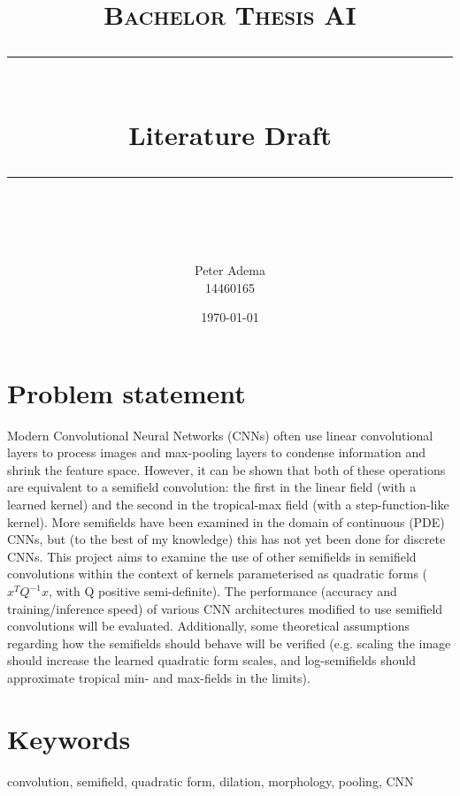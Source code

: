 \documentclass[11pt]{article} %
\title{	
    \vspace*{-1.5cm}
	\normalfont\normalsize
	\textsc{Bachelor Thesis AI}\\ %
	\vspace{3pt}
	\rule{\linewidth}{0.5pt}\\
	\vspace{14pt}
	{\huge Literature Draft}\\ %
	\vspace{4pt}
	\rule{\linewidth}{2pt}\\
	\vspace{4pt}
}
\author{
    \Large Peter Adema \\ 14460165
}
\date{\normalsize\today}  %
\begin{document}
\maketitle %

\section{Problem statement}
Modern Convolutional Neural Networks (CNNs) often use linear convolutional layers to process images and max-pooling layers to condense information and shrink the feature space. However, it can be shown that both of these operations are equivalent to a semifield convolution: the first in the linear field (with a learned kernel) and the second in the tropical-max field (with a step-function-like kernel). More semifields have been examined in the domain of continuous (PDE) CNNs, but (to the best of my knowledge) this has not yet been done for discrete CNNs. This project aims to examine the use of other semifields in semifield convolutions within the context of kernels parameterised as quadratic forms ($x^TQ^{-1}x$, with Q positive semi-definite). The performance (accuracy and training/inference speed) of various CNN architectures modified to use semifield convolutions will be evaluated. Additionally, some theoretical assumptions regarding how the semifields should behave will be verified (e.g. scaling the image should increase the learned quadratic form scales, and log-semifields should approximate tropical min- and max-fields in the limits). 
\section{Keywords}
convolution, semifield, quadratic form, dilation, morphology, pooling, CNN

\newpage
\end{document}
